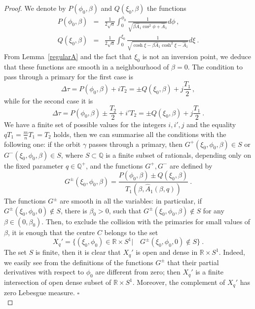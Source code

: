 \documentclass[a4paper]{article}
\begin{document}
\begin{proof}
We denote by $P(\phi_0,\beta)$ and $Q(\xi_0,\beta)$ the functions
\begin{eqnarray*}
P(\phi_0,\beta)&=& \frac{1}{2\sqrt{a}}\int_0^{\phi_0}
\frac{1}{\sqrt{\beta\hat{A}_1\cos^2\phi+\hat{A}_1}} d\phi 
\,,
\\
Q(\xi_0,\beta)&=& \frac{1}{2\sqrt{a}} \int_0^{\xi_0}
\frac{1}{\sqrt{\cosh \xi - \beta \hat{A}_1 \cosh^2 \xi - \hat{A}_1}}d\xi 
\ .
\end{eqnarray*}
From Lemma~\ref{regularA} and the fact that $\xi_0$ is not an inversion point, 
we deduce that these functions are smooth in a neighbourhood of $\beta=0$.
The condition to pass through a primary for the first case is
\[
\Delta \tau
= P(\phi_0,\beta) + i T_2 
= \pm Q(\xi_0,\beta) + j \frac{T_1}{2}
\,,
\]
while for the second case it is 
\[
\Delta \tau
= P(\phi_0,\beta) \pm \frac{T_2}{2}+ i' T_2 
= \pm Q(\xi_0,\beta) + j \frac{T_1}{2}
\ .
\]
We have a finite set of possible values for the integers $i, i',j$ and the 
equality $qT_1=\frac{m}{n}T_1=T_2$ holds, then we can summarise all the 
conditions with the following one:
if the orbit $\gamma$ passes through a primary, then 
$G^+(\xi_0,\phi_0,\beta) \in S$ or $G^-(\xi_0,\phi_0,\beta) \in S$, where 
$S \subset {\mathbb{Q}}$ is a finite subset of rationals, depending only on the fixed 
parameter $q \in {\mathbb{Q}}^+$, and the functions $G^+,G^-$ are defined by
\[
G^{\pm}(\xi_0,\phi_0,\beta)= 
\frac{P(\phi_0,\beta)\pm Q(\xi_0,\beta)}{T_1(\beta, \hat{A}_1(\beta,q))}
\ .
\]
The functions $G^{\pm}$ are smooth in all the variables: in
particular, if $G^{\pm}(\xi_0,\phi_0,0)\notin S $, there is
$\beta_0>0$, such that $G^{\pm}(\xi_0,\phi_0,\beta) \notin S$ for any
$\beta \in (0,\beta_0)$.  Then, to exclude the collision with the
primaries for small values of $\beta$, it is enough that the centre
$C$ belongs to the set
\[
X_q'=\{(\xi_0,\phi_0)\in {\mathbb{R}} \times S^1| 
\quad G^{\pm}(\xi_0,\phi_0,0)\notin S \}\ .
\] 
The set $S$ is finite, then it is clear that $X_q'$ is open and dense
in ${\mathbb{R}} \times S^1$. Indeed, we easily see from the definitions of the
functions $G^{\pm}$ that their partial derivatives with respect to
$\phi_0$ are different from zero; then $X_q'$ is a finite intersection
of open dense subset of ${\mathbb{R}} \times S^1$.  Moreover, the complement of
$X_q'$ has zero Lebesgue measure.  {$\square$\\}
\end{proof}
\end{document}
